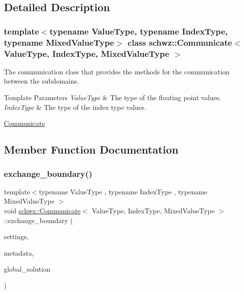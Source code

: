 \subsection{Detailed Description}
\subsubsection*{template$<$typename Value\+Type, typename Index\+Type, typename Mixed\+Value\+Type$>$\newline
class schwz\+::\+Communicate$<$ Value\+Type, Index\+Type, Mixed\+Value\+Type $>$}

The communication class that provides the methods for the communication between the subdomains. 


\begin{DoxyTemplParams}{Template Parameters}
{\em Value\+Type} & The type of the floating point values. \\
\hline
{\em Index\+Type} & The type of the index type values.\\
\hline
\end{DoxyTemplParams}
\hyperlink{group__comm}{Communicate} 

\subsection{Member Function Documentation}
\mbox{\label{classschwz_1_1Communicate_a41794ecd95f7f7e590ae27bb6ca6e6e1}} 
\subsubsection{\texorpdfstring{exchange\+\_\+boundary()}{exchange\_boundary()}}
{\footnotesize\ttfamily template$<$typename Value\+Type , typename Index\+Type , typename Mixed\+Value\+Type $>$ \\
void \hyperlink{classschwz_1_1Communicate}{schwz\+::\+Communicate}$<$ Value\+Type, Index\+Type, Mixed\+Value\+Type $>$\+::exchange\+\_\+boundary (\begin{DoxyParamCaption}\item[{const \hyperlink{structschwz_1_1Settings}{Settings} \&}]{settings,  }\item[{const \hyperlink{structschwz_1_1Metadata}{Metadata}$<$ Value\+Type, Index\+Type $>$ \&}]{metadata,  }\item[{std\+::shared\+\_\+ptr$<$ gko\+::matrix\+::\+Dense$<$ Value\+Type $>$$>$ \&}]{global\+\_\+solution }\end{DoxyParamCaption})\hspace{0.3cm}{\ttfamily [pure virtual]}}




